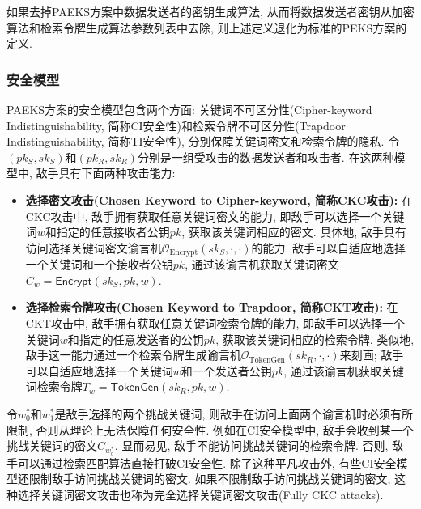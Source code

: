 \begin{note}
如果去掉PAEKS方案中数据发送者的密钥生成算法, 从而将数据发送者密钥从加密算法和检索令牌生成算法参数列表中去除, 则上述定义退化为标准的PEKS方案的定义.
\end{note}

\subsubsection{安全模型}
PAEKS方案的安全模型包含两个方面: 关键词不可区分性(Cipher-keyword Indistinguishability, 简称CI安全性)和检索令牌不可区分性(Trapdoor Indistinguishability, 简称TI安全性), 分别保障关键词密文和检索令牌的隐私. 令$(pk_S, sk_S)$和$(pk_R, sk_R)$分别是一组受攻击的数据发送者和攻击者. 在这两种模型中, 敌手具有下面两种攻击能力:
\begin{itemize}
\item \textbf{选择密文攻击(Chosen Keyword to Cipher-keyword, 简称CKC攻击):} 在CKC攻击中, 敌手拥有获取任意关键词密文的能力, 即敌手可以选择一个关键词$w$和指定的任意接收者公钥$pk$, 获取该关键词相应的密文. 具体地, 敌手具有访问选择关键词密文谕言机$\mathcal{O}_{\text{Encrypt}}(sk_S, \cdot, \cdot)$的能力. 敌手可以自适应地选择一个关键词和一个接收者公钥$pk$, 通过该谕言机获取关键词密文$C_w=\mathsf{Encrypt}(sk_S, pk, w)$.

\item \textbf{选择检索令牌攻击(Chosen Keyword to Trapdoor, 简称CKT攻击):} 在CKT攻击中, 敌手拥有获取任意关键词检索令牌的能力, 即敌手可以选择一个关键词$w$和指定的任意发送者的公钥$pk$, 获取该关键词相应的检索令牌. 类似地, 敌手这一能力通过一个检索令牌生成谕言机$\mathcal{O}_{\text{TokenGen}}(sk_R, \cdot, \cdot)$来刻画; 敌手可以自适应地选择一个关键词$w$和一个发送者公钥$pk$, 通过该谕言机获取关键词检索令牌$T_w=\mathsf{TokenGen}(sk_R, pk, w)$.
\end{itemize}

令$w_0^*$和$w_1^*$是敌手选择的两个挑战关键词, 则敌手在访问上面两个谕言机时必须有所限制, 否则从理论上无法保障任何安全性. 例如在CI安全模型中, 敌手会收到某一个挑战关键词的密文$C_{w_b^*}$. 显而易见, 敌手不能访问挑战关键词的检索令牌. 否则, 敌手可以通过检索匹配算法直接打破CI安全性. 除了这种平凡攻击外, 有些CI安全模型还限制敌手访问挑战关键词的密文. 如果不限制敌手访问挑战关键词的密文, 这种选择关键词密文攻击也称为完全选择关键词密文攻击(Fully CKC attacks).


